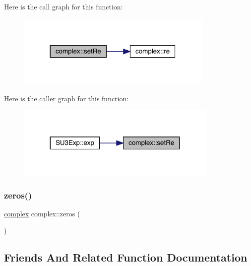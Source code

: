 Here is the call graph for this function\+:
\nopagebreak
\begin{figure}[H]
\begin{center}
\leavevmode
\includegraphics[width=269pt]{classcomplex_a360f0c3963a8e654ccbc16712294f4d7_cgraph}
\end{center}
\end{figure}
Here is the caller graph for this function\+:
\nopagebreak
\begin{figure}[H]
\begin{center}
\leavevmode
\includegraphics[width=275pt]{classcomplex_a360f0c3963a8e654ccbc16712294f4d7_icgraph}
\end{center}
\end{figure}
\mbox{\label{classcomplex_ab1009ede7230f86df1a13f9c5c258ac7}} 
\subsubsection{\texorpdfstring{zeros()}{zeros()}}
{\footnotesize\ttfamily \mbox{\hyperlink{classcomplex}{complex}} complex\+::zeros (\begin{DoxyParamCaption}{ }\end{DoxyParamCaption})}



\subsection{Friends And Related Function Documentation}
\mbox{\label{classcomplex_aad6a59c1e6f7a869a693e1eba8b2604d}} 
